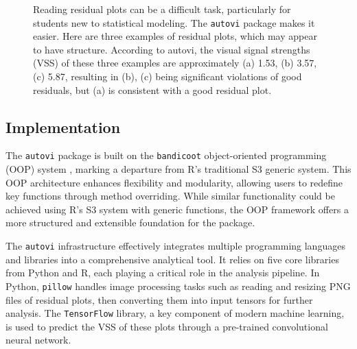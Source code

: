 \documentclass[
doublespace,
  times]{anzsauth}
\begin{document}
\begin{figure}


\caption{\label{fig-three-examples}Reading residual plots can be a
difficult task, particularly for students new to statistical modeling.
The \texttt{autovi} package makes it easier. Here are three examples of
residual plots, which may appear to have structure. According to autovi,
the visual signal strengths (VSS) of these three examples are
approximately (a) 1.53, (b) 3.57, (c) 5.87, resulting in (b), (c) being
significant violations of good residuals, but (a) is consistent with a
good residual plot.}

\end{figure}%

\subsection{Implementation}\label{sec-autovi-implementation}

The \texttt{autovi} package is built on the \texttt{bandicoot}
object-oriented programming (OOP) system \citep{bandicoot}, marking a
departure from R's traditional S3 generic system. This OOP architecture
enhances flexibility and modularity, allowing users to redefine key
functions through method overriding. While similar functionality could
be achieved using R's S3 system with generic functions, the OOP
framework offers a more structured and extensible foundation for the
package.

The \texttt{autovi} infrastructure effectively integrates multiple
programming languages and libraries into a comprehensive analytical
tool. It relies on five core libraries from Python and R, each playing a
critical role in the analysis pipeline. In Python, \texttt{pillow}
\citep{clark2015pillow} handles image processing tasks such as reading
and resizing PNG files of residual plots, then converting them into
input tensors for further analysis. The \texttt{TensorFlow}
\citep{abadi2016tensorflow} library, a key component of modern machine
learning, is used to predict the VSS of these plots through a
pre-trained convolutional neural network.
\end{document}
